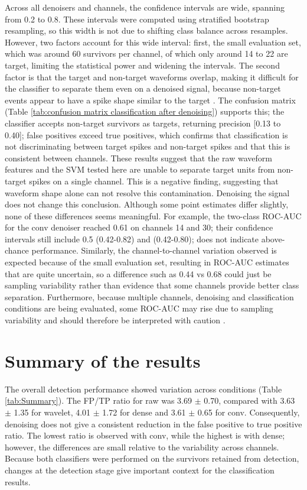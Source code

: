 \documentclass[ %
                    author={Rzan Alkabier},
                    supervisor={Dr. Zahraa Abdallah},
                    degree={MSc},
                     title={Denoising Extracellular Recording for Spike Detection and Classification on Single Channels},
                    subtitle={Does denoising improve detection and classification performance?},
                      type={},
                      year={2026}]{dissertation}
\begin{document}
Across all denoisers and channels, the confidence intervals are wide, spanning from 0.2 to 0.8. These intervals were computed using stratified bootstrap resampling, so this width is not due to shifting class balance across resamples. However, two factors account for this wide interval: first, the small evaluation set, which was around 60 survivors per channel, of which only around 14 to 22 are target, limiting the statistical power and widening the intervals. The second factor is that the target and non-target waveforms overlap, making it difficult for the classifier to separate them even on a denoised signal, because non-target events appear to have a spike shape similar to the target \cite{troglio_hybrid_2026, hill_quality_2011}. The confusion matrix (Table \ref{tab:confusion matrix classification after denoising}) supports this; the classifier accepts non-target survivors as targets, returning precision [0.13 to 0.40]; false positives exceed true positives, which confirms that classification is not discriminating between target spikes and non-target spikes and that this is consistent between channels. 
These results suggest that the raw waveform features and the SVM tested here are unable to separate target units from non-target spikes on a single channel. This is a negative finding, suggesting that waveform shape alone can not resolve this contamination. Denoising the signal does not change this conclusion. Although some point estimates differ slightly, none of these differences seems meaningful. For example, the two-class ROC-AUC for the conv denoiser reached 0.61 on channels 14 and 30; their confidence intervals still include 0.5 (0.42-0.82) and (0.42-0.80); does not indicate above-chance performance. Similarly, the channel-to-channel variation observed is expected because of the small evaluation set, resulting in ROC-AUC estimates that are quite uncertain, so a difference such as 0.44 vs 0.68 could just be sampling variability rather than evidence that some channels provide better class separation. Furthermore, because multiple channels, denoising and classification conditions are being evaluated, some ROC-AUC may rise due to sampling variability and should therefore be interpreted with caution \cite{sullivan_facts_2021}. 
\section{Summary of the results}
The overall detection performance showed variation across conditions (Table \ref{tab:Summary}). The FP/TP ratio for raw was 3.69 $\pm$ 0.70, compared with 3.63 $\pm$ 1.35 for wavelet, 4.01 $\pm$ 1.72 for dense and 3.61 $\pm$ 0.65 for conv. Consequently, denoising does not give a consistent reduction in the false positive to true positive ratio. The lowest ratio is observed with conv, while the highest is with dense; however, the differences are small relative to the variability across channels. 
Because both classifiers were performed on the survivors retained from detection, changes at the detection stage give important context for the classification results. 
\end{document}
